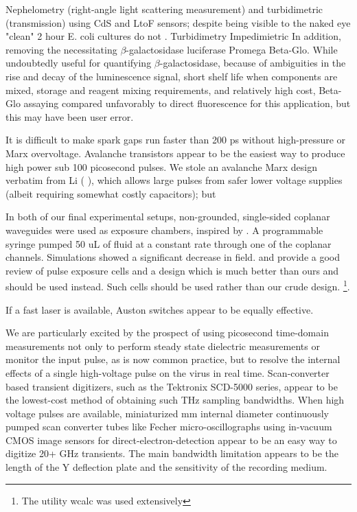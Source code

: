 \documentclass[paper.tex]{subfiles}
\begin{document}
Nephelometry (right-angle light scattering measurement) and turbidimetric (transmission) using CdS and LtoF sensors; despite being visible to the naked eye "clean" 2 hour E. coli cultures do not .  Turbidimetry Impedimietric In addition, removing the necessitating 
$\beta$-galactosidase luciferase Promega Beta-Glo\cite{rapid2014}. While undoubtedly useful for quantifying $\beta$-galactosidase, because of ambiguities in the rise and decay of the luminescence signal, short shelf life when components are mixed, storage and reagent mixing requirements, and relatively high cost, Beta-Glo assaying compared unfavorably to direct fluorescence for this application, but this may have been user error.


It is difficult to make spark gaps run faster than 200 ps without high-pressure or Marx overvoltage. Avalanche transistors appear to be the easiest way to produce high power sub 100 picosecond pulses. We stole an avalanche Marx design verbatim from Li (\cite{Development2016b} \cite{Design2018c}), which allows large pulses from safer lower voltage supplies (albeit requiring somewhat costly capacitors); but 

In both of our final experimental setups, non-grounded, single-sided coplanar waveguides were used as exposure chambers, inspired by \cite{Microwave2007}. A programmable syringe pumped 50 uL of fluid at a constant rate through one of the coplanar channels. Simulations showed a significant decrease in field. \cite{Microchamber2011} and \cite{Characterization2012} provide a good review of pulse exposure cells and a design which is much better than ours and should be used instead. Such cells should be used rather than our crude design. \footnote{The utility wcalc was used extensively}.

If a fast laser is available, Auston switches appear to be equally effective.

We are particularly excited by the prospect of using picosecond time-domain measurements not only to perform steady state dielectric measurements or monitor the input pulse, as is now common practice, but to resolve the internal effects of a single high-voltage pulse on the virus in real time. Scan-converter based transient digitizers, such as the Tektronix SCD-5000 series, appear to be the lowest-cost method of obtaining such THz sampling bandwidths. When high voltage pulses are available, miniaturized  mm internal diameter continuously pumped scan converter tubes like Fecher micro-oscillographs using in-vacuum CMOS image sensors for direct-electron-detection appear to be an easy way to digitize 20+ GHz transients. The main bandwidth limitation appears to be the length of the Y deflection plate and the sensitivity of the recording medium.
\end{document}
